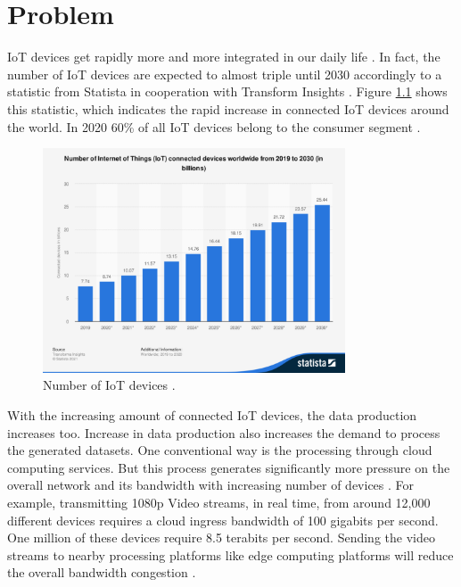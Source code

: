 \chapter{Problem}\label{chap:problem}
\acrfull{IoT} devices get rapidly more and more integrated in our daily life \cite{Yu2017}. In fact, the number of IoT devices are expected to almost triple until 2030 accordingly to a statistic from Statista in cooperation with Transform Insights  \cite{StatisticTransformaInsights} \cite{StatisticTransformaInsightsByUseCase}. Figure \ref{fig:mumber_of_iot_devices} shows this statistic, which indicates the rapid increase in connected IoT devices around the world. In 2020 60\% of all IoT devices belong to the consumer segment \cite{StatisticTransformaInsightsByUseCase}.

\begin{figure}[H]
    \centering
    \includegraphics[width=0.8\textwidth]{assets/problem/statistic_id1183457_number-of-iot-connected-devices-worldwide-2019-2030.pdf}
    \caption{Number of IoT devices \cite{StatisticTransformaInsights}.}\label{fig:mumber_of_iot_devices}
\end{figure}

With the increasing amount of connected IoT devices, the data production increases too. Increase in data production also increases the demand to process the generated datasets. One conventional way  is the processing through cloud computing services. But this process generates significantly more pressure on the overall network and its bandwidth with increasing number of devices \cite{Yu2017}. For example, transmitting 1080p Video streams, in real time, from around 12,000 different devices requires a cloud ingress bandwidth of 100 gigabits per second. One million of these devices require 8.5 terabits per second. Sending the video streams to nearby processing platforms like edge computing platforms will reduce the overall bandwidth congestion \cite{Shi2016a}. 

